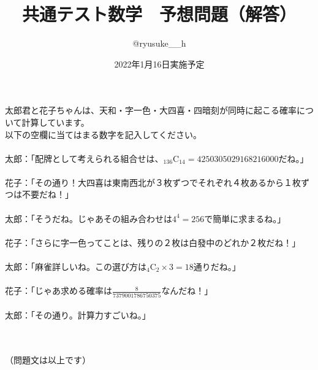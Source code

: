 \documentclass[dvipdfmx,uplatex]{jsarticle}
\title{共通テスト数学　予想問題（解答）}
\author{@ryusuke\_\_h}
\date{2022年1月16日実施予定}
\begin{document}
\maketitle

太郎君と花子ちゃんは、天和・字一色・大四喜・四暗刻が同時に起こる確率について計算しています。\\
以下の空欄に当てはまる数字を記入してください。\\ \\


太郎：「配牌として考えられる組合せは、${}_{136} \mathrm{C}_{14} = 4250305029168216000$だね。」\\ \\

花子：「その通り！大四喜は東南西北が３枚ずつでそれぞれ４枚あるから１枚ずつは不要だね！」\\ \\


太郎：「そうだね。じゃあその組み合わせは$\displaystyle 4^4 = 256$で簡単に求まるね。」\\ \\

花子：「さらに字一色ってことは、残りの２枚は白發中のどれか２枚だね！」\\ \\

太郎：「麻雀詳しいね。この選び方は$\displaystyle {}_{4} \mathrm{C}_{2} \times 3 = 18$通りだね。」\\
 \\

花子：「じゃあ求める確率は$\displaystyle \frac{8}{7379001786750375}$なんだね！」\\ \\

太郎：「その通り。計算力すごいね。」\\ \\ \\

\begin{center}
  （問題文は以上です）
\end{center}
\end{document}
